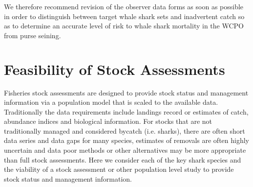 \documentclass[12pt]{SCreport}
\begin{document}
We therefore recommend revision of the observer data forms as soon as possible in order to distinguish between target whale shark sets and inadvertent catch so as to determine an accurate level of risk to whale shark mortality in the WCPO from purse seining.
  
  
  
      
\section{Feasibility of Stock Assessments}
Fisheries stock assessments are designed to provide stock status and management information via a population model that is scaled to the available data. Traditionally the data requirements include landings record or estimates of catch, abundance indices and biological information. For stocks that are not traditionally managed and considered bycatch (i.e. sharks), there are often short data series and data gaps for many species, estimates of removals are often highly uncertain and data poor methods or other alternatives may be more appropriate than full stock assessments. Here we consider each of the key shark species and the viability of a stock assessment or other population level study to provide stock status and management information.
\end{document}
